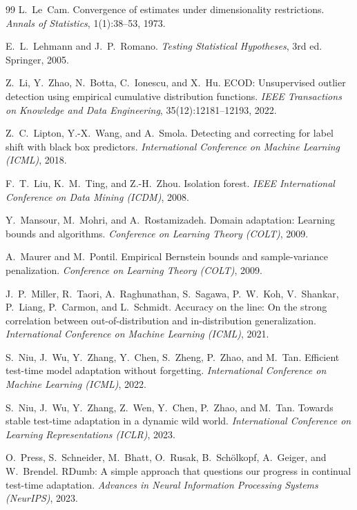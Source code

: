 \begin{thebibliography}{99}
L.~Le~Cam.
Convergence of estimates under dimensionality restrictions.
\textit{Annals of Statistics}, 1(1):38--53, 1973.

E.~L.~Lehmann and J.~P.~Romano.
\textit{Testing Statistical Hypotheses}, 3rd ed.
Springer, 2005.

Z.~Li, Y.~Zhao, N.~Botta, C.~Ionescu, and X.~Hu.
ECOD: Unsupervised outlier detection using empirical cumulative
distribution functions.
\textit{IEEE Transactions on Knowledge and Data Engineering}, 35(12):12181--12193, 2022.

Z.~C.~Lipton, Y.-X.~Wang, and A.~Smola.
Detecting and correcting for label shift with black box predictors.
\textit{International Conference on Machine Learning (ICML)}, 2018.

F.~T.~Liu, K.~M.~Ting, and Z.-H.~Zhou.
Isolation forest.
\textit{IEEE International Conference on Data Mining (ICDM)}, 2008.

Y.~Mansour, M.~Mohri, and A.~Rostamizadeh.
Domain adaptation: Learning bounds and algorithms.
\textit{Conference on Learning Theory (COLT)}, 2009.

A.~Maurer and M.~Pontil.
Empirical Bernstein bounds and sample-variance penalization.
\textit{Conference on Learning Theory (COLT)}, 2009.

J.~P.~Miller, R.~Taori, A.~Raghunathan, S.~Sagawa, P.~W.~Koh, V.~Shankar,
P.~Liang, P.~Carmon, and L.~Schmidt.
Accuracy on the line: On the strong correlation between out-of-distribution and
in-distribution generalization.
\textit{International Conference on Machine Learning (ICML)}, 2021.

S.~Niu, J.~Wu, Y.~Zhang, Y.~Chen, S.~Zheng, P.~Zhao, and M.~Tan.
Efficient test-time model adaptation without forgetting.
\textit{International Conference on Machine Learning (ICML)}, 2022.

S.~Niu, J.~Wu, Y.~Zhang, Z.~Wen, Y.~Chen, P.~Zhao, and M.~Tan.
Towards stable test-time adaptation in a dynamic wild world.
\textit{International Conference on Learning Representations (ICLR)}, 2023.

O.~Press, S.~Schneider, M.~Bhatt, O.~Rusak, B.~Sch\"olkopf, A.~Geiger,
and W.~Brendel.
RDumb: A simple approach that questions our progress in continual test-time
adaptation.
\textit{Advances in Neural Information Processing Systems (NeurIPS)}, 2023.


\end{thebibliography}
